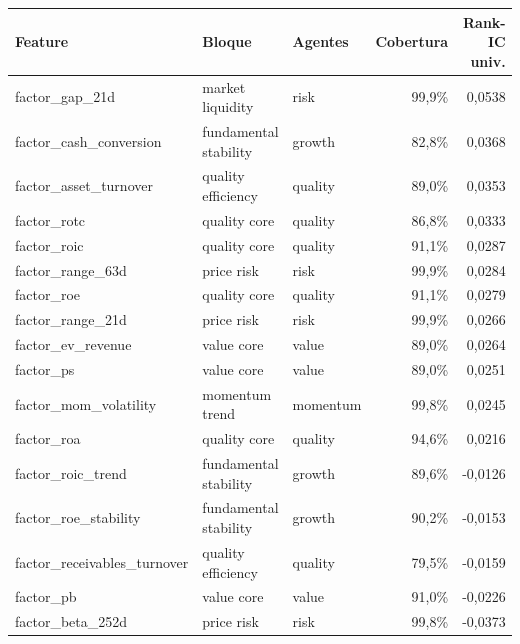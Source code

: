 \begin{tabular}{lllrr}
\toprule
Feature & Bloque & Agentes & Cobertura & Rank-IC univ. \\
\midrule
factor\_gap\_21d & market liquidity & risk & 99,9\% & 0,0538 \\
factor\_cash\_conversion & fundamental stability & growth & 82,8\% & 0,0368 \\
factor\_asset\_turnover & quality efficiency & quality & 89,0\% & 0,0353 \\
factor\_rotc & quality core & quality & 86,8\% & 0,0333 \\
factor\_roic & quality core & quality & 91,1\% & 0,0287 \\
factor\_range\_63d & price risk & risk & 99,9\% & 0,0284 \\
factor\_roe & quality core & quality & 91,1\% & 0,0279 \\
factor\_range\_21d & price risk & risk & 99,9\% & 0,0266 \\
factor\_ev\_revenue & value core & value & 89,0\% & 0,0264 \\
factor\_ps & value core & value & 89,0\% & 0,0251 \\
factor\_mom\_volatility & momentum trend & momentum & 99,8\% & 0,0245 \\
factor\_roa & quality core & quality & 94,6\% & 0,0216 \\
factor\_roic\_trend & fundamental stability & growth & 89,6\% & -0,0126 \\
factor\_roe\_stability & fundamental stability & growth & 90,2\% & -0,0153 \\
factor\_receivables\_turnover & quality efficiency & quality & 79,5\% & -0,0159 \\
factor\_pb & value core & value & 91,0\% & -0,0226 \\
factor\_beta\_252d & price risk & risk & 99,8\% & -0,0373 \\
\bottomrule
\end{tabular}
